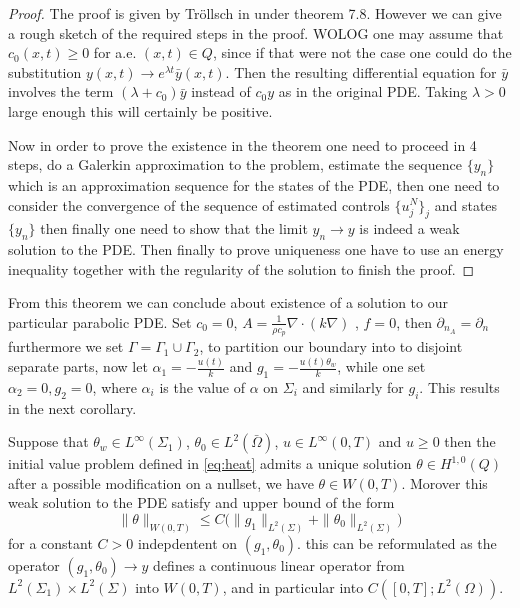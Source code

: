 \begin{proof}
The proof is given by Tröllsch in \cite{optimalControl} under theorem 7.8. However we can give a rough sketch of the required steps in the proof. WOLOG one may assume that $c_0(x,t)\geq 0$ for a.e. $(x,t) \in Q$, since if that were not the case one could do the substitution $y(x,t) \rightarrow e^{\lambda t}\bar{y}(x,t)$. Then the resulting differential equation for $\bar{y}$ involves the term $(\lambda + c_0)\bar{y}$ instead of $c_0y$ as in the original PDE. Taking $\lambda >0$ large enough this will certainly be positive. 

Now in order to prove the existence in the theorem one need to proceed in 4 steps, do a Galerkin approximation to the problem, estimate the sequence $\{y_n \}$ which is an approximation sequence for the states of the PDE, then one need to consider the convergence of the sequence of estimated controls $\{u_j^N\}_j$ and states $\{ y_n \}$ then finally one need to show that the limit $y_n \rightarrow y$ is indeed a weak solution to the PDE. Then finally to prove uniqueness one have to use an energy inequality together with the regularity of the solution to finish the proof.
\end{proof}


From this theorem we can conclude about existence of a solution to our particular parabolic PDE. Set $c_0 = 0$, $A = \frac{1}{\rho c_p}\nabla \cdot (k\nabla)$ , $f = 0$, then $\partial_{n_A} = \partial_n$ furthermore we set $\Gamma = \Gamma_1 \cup \Gamma_2$, to partition our boundary into to disjoint separate parts, now let $\alpha_1 = -\frac{u(t)}{k}$ and $g_1 = -\frac{u(t)\theta_w}{k}$, while one set $\alpha_2 = 0, g_2 = 0$, where $\alpha_i$ is the value of $\alpha$ on $\Sigma_i$ and similarly for $g_i$. This results in the next corollary. 

\begin{corollary}[Existence]
Suppose that $\theta_w \in L^{\infty}(\Sigma_1)$, $\theta_0 \in L^2(\bar{\Omega})$, $u \in L^{\infty}(0,T)$ and $u\geq 0$ then the initial value problem defined in \eqref{eq:heat} admits a unique solution $\theta \in H^{1,0}(Q)$ after a possible modification on a nullset, we have $\theta \in W(0,T)$. Morover this weak solution to the PDE satisfy and upper bound of the form 
\begin{equation*}
    \|\theta \|_{W(0,T)} \leq C\bigg ( \|g_1\|_{L^2(\Sigma)} + \|\theta_0\|_{L^2(\Sigma)} \bigg )
\end{equation*}
for a constant $C>0$ indepdentent on $(g_1, \theta_0)$. this can be reformulated as the operator $(g_1,\theta_0) \rightarrow y$ defines a continuous linear operator from $L^2(\Sigma_1)\times L^2(\Sigma)$ into $W(0,T)$, and in particular into $C([0,T];L^2(\Omega))$.  
\end{corollary}


